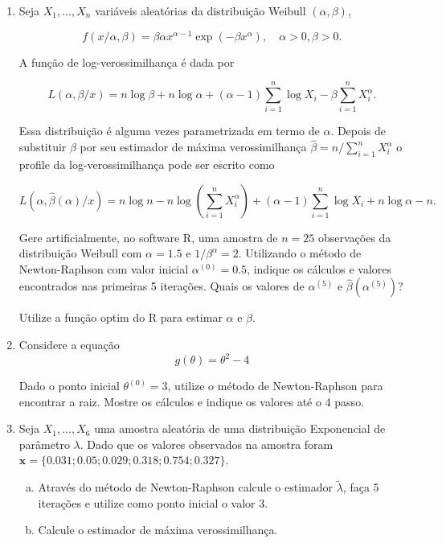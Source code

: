 \documentclass[10pt,brazil,addpoints]{exam}
\begin{document}
\begin{enumerate}[1.]

\item Seja $X_1, \ldots, X_n$ variáveis aleatórias da distribuição Weibull $(\alpha, \beta)$, 

$$
f(x/\alpha, \beta)=\beta \alpha x^{\alpha-1}\exp(-\beta x^\alpha), \quad \alpha >0, \beta>0.
$$

A função de log-verossimilhança é dada por 

$$
L(\alpha, \beta/x) = n\log\beta + n\log \alpha + (\alpha-1) \sum_{i=1}^n \log X_i -\beta\sum_{i=1}^n X_i^\alpha.
$$

Essa distribuição é alguma vezes parametrizada em termo de $\alpha$. Depois de substituir $\beta$ por seu estimador de máxima verossimilhança $\hat{\beta}=n/\sum_{i=1}^n X_i^\alpha$ o profile da log-verossimilhança pode ser escrito como 

$$
L(\alpha, \hat{\beta}(\alpha)/x) = n\log n -n \log (\sum_{i=1}^n X_i^{\alpha}) + (\alpha-1) \sum_{i=1}^n \log X_i + n\log \alpha -n.
$$

Gere artificialmente, no software R, uma amostra de $n=25$ observações da distribuição Weibull com $\alpha=1.5$ e $1/\beta^\alpha=2$. Utilizando o método de Newton-Raphson com valor inicial $\alpha^{(0)}=0.5$, indique os cálculos e valores encontrados nas primeiras 5 iterações. Quais os valores de $\alpha^{(5)}$ e $\hat{\beta}(\alpha^{(5)})$?

Utilize a função optim do R para estimar $\alpha$ e $\beta$.

\item Considere a equação
$$
g(\theta)= \theta^2 -4
$$

Dado o ponto inicial $\theta^{(0)}=3$, utilize o método de Newton-Raphson para encontrar a raiz. Mostre os cálculos e indique os valores até o 4 passo. 

\item Seja $X_1, \ldots, X_6$ uma amostra aleatória de uma distribuição Exponencial de parâmetro $\lambda$. Dado que os valores observados na amostra foram  $\textbf{x}=\{0.031; 0.05; 0.029; 0.318; 0.754; 0.327\}$. 

\begin{enumerate}[a)]
\item Através do método de Newton-Raphson calcule o estimador $\tilde{\lambda}$, faça 5 iterações e utilize como ponto inicial o valor 3. 

\item Calcule o estimador de máxima verossimilhança.


\end{enumerate}
\end{enumerate}
\end{document}
